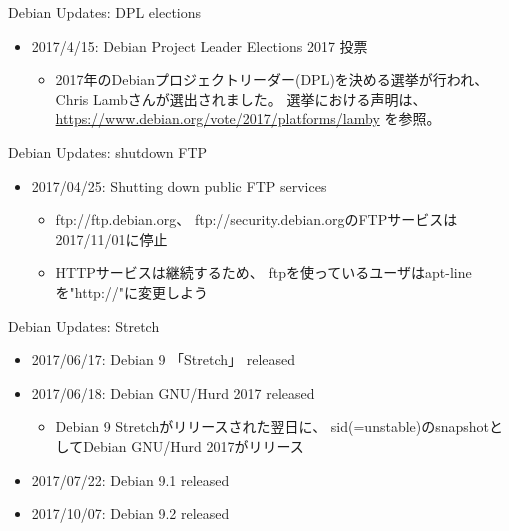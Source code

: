 \documentclass[cjk,c,squeeze,shrink,dvipdfmx,12pt]{beamer}
\begin{document}
\begin{frame}[fragile]{Debian Updates: DPL elections}%
  \begin{itemize}[<+->]
  \item 2017/4/15:  Debian Project Leader Elections 2017 投票
    \begin{itemize}
    \item %
      2017年のDebianプロジェクトリーダー(DPL)を決める選挙が行われ、Chris Lambさんが選出されました。
      選挙における声明は、\url{https://www.debian.org/vote/2017/platforms/lamby} を参照。
    \end{itemize}
  \end{itemize}
\end{frame}


\begin{frame}[fragile]{Debian Updates: shutdown FTP}%
  \begin{itemize}[<+->]
  \item 2017/04/25:  Shutting down public FTP services
    \begin{itemize}
    \item %
      ftp://ftp.debian.org、
      ftp://security.debian.orgのFTPサービスは 2017/11/01に停止
    \item %
      HTTPサービスは継続するため、
      ftpを使っているユーザはapt-lineを"http://"に変更しよう
    \end{itemize}
  \end{itemize}
\end{frame}

\begin{frame}[fragile]{Debian Updates: Stretch}%
  \begin{itemize}[<+->]
  \item 2017/06/17:  Debian 9 「Stretch」 released
  \item 2017/06/18:  Debian GNU/Hurd 2017 released
    \begin{itemize}
    \item
      Debian 9 Stretchがリリースされた翌日に、
      sid(=unstable)のsnapshotとしてDebian GNU/Hurd 2017がリリース
    \end{itemize}
  \item 2017/07/22:  Debian 9.1 released
  \item 2017/10/07:  Debian 9.2 released
  \end{itemize}
\end{frame}
\end{document}
